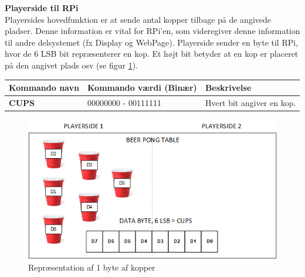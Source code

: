 \documentclass[Arkitektur/System_main.tex]{subfiles}
\begin{document}
\textbf{Playerside til RPi}
\\Playersides hovedfunktion er at sende antal kopper tilbage på de angivede pladser. Denne information er vital for RPi'en, som videregiver denne information til andre delsystemet (fx Display og WebPage). 
Playerside sender en byte til RPi, hvor de 6 LSB bit repræsenterer en kop. Et højt bit betyder at en kop er placeret på den angivet plads osv (se figur \ref{fig:cups_setup}). 
\begin{table}[H]
\centering
\begin{tabular}{|L{0.3\textwidth}|L{0.3\textwidth}|L{0.3\textwidth}|}
\hline
\textbf{Kommando navn} & \textbf{Kommando værdi (Binær)} & \textbf{Beskrivelse} \\ \hline
\textbf{CUPS} & 00000000 - 00111111 & Hvert bit angiver en kop. \\ \hline
\end{tabular}
\end{table}

\begin{figure}[H]
    \centering
    \includegraphics[width=\textwidth]{Arkitektur/Grenseflader/Graphics/cups.png}
    \caption{Repræsentation af 1 byte af kopper}
    \label{fig:cups_setup}
\end{figure}
\end{document}
